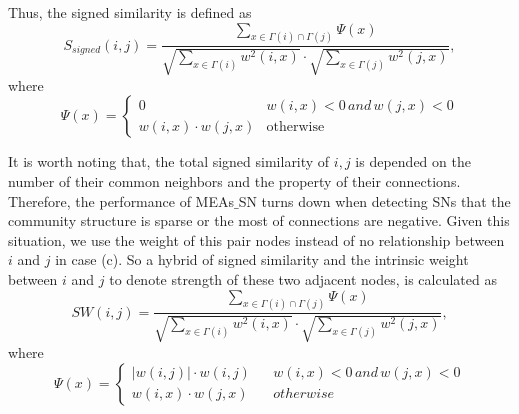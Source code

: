 \documentclass[10pt, journal]{IEEEtran}
\begin{document}
Thus, the signed similarity is defined as
\begin{equation}
S_{signed}(i,j)=\frac{\sum\limits_{x\in\Gamma(i)\cap\Gamma(j)} \Psi(x)}
{\sqrt{\sum\limits_{x \in \Gamma(i)} w^2(i,x)} \cdot \sqrt{\sum\limits_{x \in \Gamma(j)} w^2(j,x)}},
\end{equation}
where
$$\Psi(x)=
\begin{cases}
0			  & \text{$w(i,x)  < 0 \, and \,  w(j,x) < 0$}\\
w(i,x)\cdot w(j,x) & \text{otherwise} 
\end{cases}$$

It is worth noting that, the total signed similarity of $i, j$ is depended on the number of their common neighbors and the property of their connections. Therefore, the performance of MEAs$\_$SN turns down when detecting SNs that the community structure  is sparse  or the most of connections are negative. Given this situation, we  use the weight of this pair nodes  instead of no relationship between $i$ and $j$ in case (c). So a hybrid of signed similarity and the intrinsic weight between $i$ and $j$ to denote strength of these two adjacent nodes, is calculated as
\begin{equation}
SW(i,j)=\frac{\sum\limits_{x\in\Gamma(i)\cap\Gamma(j)} \Psi(x)}
{\sqrt{\sum\limits_{x \in \Gamma(i)} w^2(i,x)} \cdot \sqrt{\sum\limits_{x \in \Gamma(j)} w^2(j,x)}},
\end{equation}
where
$$ \Psi(x)=\left\{
\begin{array}{rcl}
|w(i,j)| \cdot w(i,j)     &      & {w(i,x)  < 0 \, and \,  w(j,x)<0}\\
w(i,x)\cdot w(j,x)      &      & {otherwise}
\end{array} \right. $$
\end{document}
